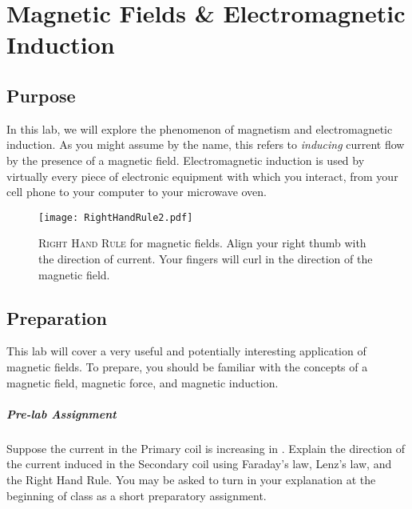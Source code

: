 \chapter{Magnetic Fields \& \newline Electromagnetic Induction}
\section{Purpose}
In this lab, we will explore the phenomenon of magnetism and electromagnetic induction.  As you might assume by the name, this refers to \textit{inducing} current flow by the presence of a magnetic field.  Electromagnetic induction is used by virtually every piece of electronic equipment with which you interact, from your cell phone to your computer to your microwave oven.  

\begin{figure}[b!]
	\centering	\label{f:rhr}
	\texttt{[image: RightHandRule2.pdf]}
	\caption[Right hand rule for magnetic fields]{\textsc{Right Hand Rule} for magnetic fields.  Align your right thumb with the direction of current.  Your fingers will curl in the direction of the magnetic field.}
	\forcerectofloat
\end{figure}

\section{Preparation}

This lab will cover a very useful and potentially interesting application of magnetic fields.  To prepare, you should be familiar with the concepts of a magnetic field, magnetic force, and magnetic induction.

\paragraph{Pre-lab Assignment}
Suppose the current in the Primary coil is increasing in .  Explain the direction of the current induced in the Secondary coil using Faraday's law, Lenz's law, and the Right Hand Rule.  You may be asked to turn in your explanation at the beginning of class as a short preparatory assignment.


